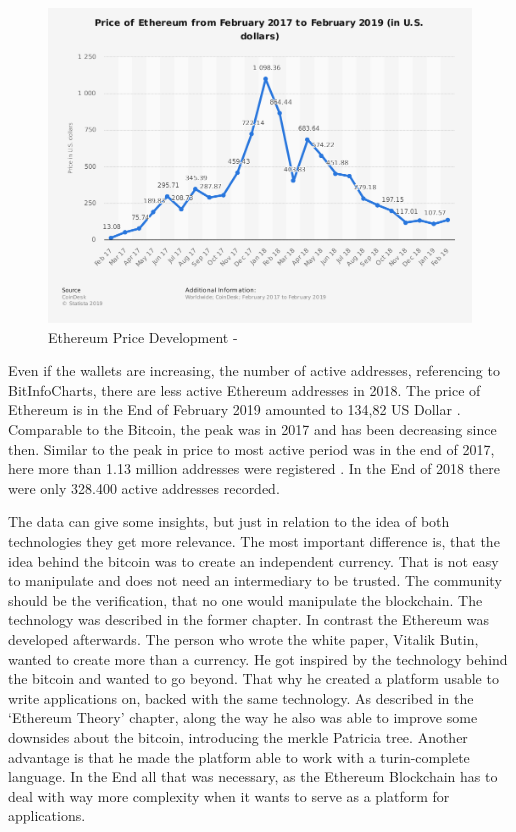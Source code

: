 \begin{figure}[h]
  \centering
  \includegraphics[width=\linewidth]{figures/EthereumPrice.png}
  \caption{Ethereum Price Development - \cite{statEthereum}}
  \label{fig:marketcapEthereum}
\end{figure}

Even if the wallets are increasing, the number of active addresses, referencing to BitInfoCharts, there are less active Ethereum addresses in 2018. 
The price of Ethereum is in the End of February 2019 amounted to 134,82 US Dollar \cite{StatPriceEther}.
Comparable to the Bitcoin, the peak was in 2017 and has been decreasing since then. 
Similar to the peak in price to most active period was in the end of 2017, here more than 1.13 million addresses were registered \cite{Partz2018}. In the End of 2018 there were only 328.400 active addresses recorded. 

The data can give some insights, but just in relation to the idea of both technologies they get more relevance. 
The most important difference is, that the idea behind the bitcoin was to create an independent currency.
That is not easy to manipulate and does not need an intermediary to be trusted. 
The community should be the verification, that no one would manipulate the blockchain. 
The technology was described in the former chapter. 
In contrast the Ethereum was developed afterwards. 
The person who wrote the white paper, Vitalik Butin, wanted to create more than a currency. \cite{vitalikwhite}
He got inspired by the technology behind the bitcoin and wanted to go beyond. 
That why he created a platform usable to write applications on, backed with the same technology. 
As described in the ‘Ethereum Theory’ chapter, along the way he also was able to improve some downsides about the bitcoin, introducing the merkle Patricia tree. 
Another advantage is that he made the platform able to work with a turin-complete language. 
In the End all that was necessary, as the Ethereum Blockchain has to deal with way more complexity when it wants to serve as a platform for applications.
